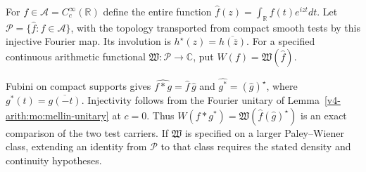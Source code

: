 \begin{definition}
\label{v4-arith:mc:test-algebra}
For $f\in\mathscr A=C_c^\infty(\mathbb R)$ define the entire function
$\widehat f(z)=\int_{\mathbb R}f(t)e^{izt}dt$.
Let $\mathscr P=\{\widehat f:f\in\mathscr A\}$, with the topology
transported from compact smooth tests by this injective Fourier map.
Its involution is $h^\star(z)=\overline{h(\overline z)}$.
For a specified continuous arithmetic functional
$\mathfrak W:\mathscr P\to\mathbb C$, put
$W(f)=\mathfrak W(\widehat f)$.
\end{definition}

Fubini on compact supports gives
$\widehat{f*g}=\widehat f\,\widehat g$ and
$\widehat{g^*}=(\widehat g)^\star$, where
$g^*(t)=\overline{g(-t)}$.
Injectivity follows from the Fourier unitary of
Lemma~\ref{v4-arith:mo:mellin-unitary} at $c=0$.
Thus $W(f*g^*)=\mathfrak W(\widehat f(\widehat g)^\star)$
is an exact comparison of the two test carriers.
If $\mathfrak W$ is specified on a larger Paley--Wiener class,
extending an identity from $\mathscr P$ to that class requires
the stated density and continuity hypotheses.

